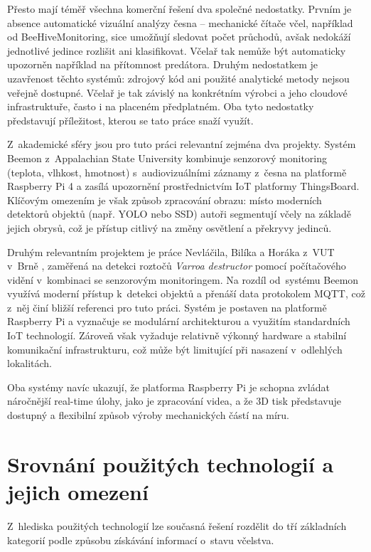 Přesto mají téměř všechna komerční řešení dva společné nedostatky. Prvním je absence automatické vizuální analýzy česna -- mechanické čítače včel, například od BeeHiveMonitoring, sice umožňují sledovat počet průchodů, avšak nedokáží jednotlivé jedince rozlišit ani klasifikovat. Včelař tak nemůže být automaticky upozorněn například na přítomnost predátora. Druhým nedostatkem je uzavřenost těchto systémů: zdrojový kód ani použité analytické metody nejsou veřejně dostupné. Včelař je tak závislý na konkrétním výrobci a jeho cloudové infrastruktuře, často i na placeném předplatném. Oba tyto nedostatky představují příležitost, kterou se tato práce snaží využít.

Z~akademické sféry jsou pro tuto práci relevantní zejména dva projekty. Systém Beemon \cite{Beemon2021} z~Appalachian State University kombinuje senzorový monitoring (teplota, vlhkost, hmotnost) s~audiovizuálními záznamy z~česna na platformě Raspberry Pi 4 a zasílá upozornění prostřednictvím IoT platformy ThingsBoard. Klíčovým omezením je však způsob zpracování obrazu: místo moderních detektorů objektů (např. YOLO nebo SSD) autoři segmentují včely na základě jejich obrysů, což je přístup citlivý na změny osvětlení a překryvy jedinců.

Druhým relevantním projektem je práce Nevláčila, Bilíka a Horáka z~VUT v~Brně \cite{Nevlacil2023}, zaměřená na detekci roztočů \textit{Varroa destructor} pomocí počítačového vidění v~kombinaci se senzorovým monitoringem. Na rozdíl od~systému Beemon využívá moderní přístup k~detekci objektů a přenáší data protokolem MQTT, což z~něj činí bližší referenci pro tuto práci. Systém je postaven na platformě Raspberry Pi a vyznačuje se modulární architekturou a využitím standardních IoT technologií. Zároveň však vyžaduje relativně výkonný hardware a stabilní komunikační infrastrukturu, což může být limitující při nasazení v~odlehlých lokalitách.

Oba systémy navíc ukazují, že platforma Raspberry Pi je schopna zvládat náročnější real-time úlohy, jako je zpracování videa, a že 3D tisk představuje dostupný a flexibilní způsob výroby mechanických částí na míru.

\section{Srovnání použitých technologií a jejich omezení}
Z~hlediska použitých technologií lze současná řešení rozdělit do tří základních kategorií podle způsobu získávání informací o~stavu včelstva. 

